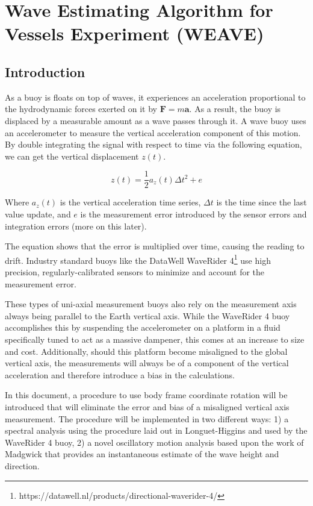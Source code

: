 \chapter{Wave Estimating Algorithm for Vessels Experiment (WEAVE)} 

\section{Introduction} 

As a buoy is floats on top of waves, it experiences an acceleration proportional to the hydrodynamic forces exerted on it by $\pmb{F} = m\pmb{a}$. 
As a result, the buoy is displaced by a measurable amount as a wave passes through it. 
A wave buoy uses an accelerometer to measure the vertical acceleration component of this motion. 
By double integrating the signal with respect to time via the following equation, we can get the vertical displacement $z(t)$.

\begin{equation}
    z(t) = \frac{1}{2} a_z(t) \Delta t^2 + e
\end{equation}

Where $a_z(t)$ is the vertical acceleration time series, $\Delta t$ is the time since the last value update, and $e$ is the measurement error introduced by the sensor errors and integration errors (more on this later).

The equation shows that the error is multiplied over time, causing the reading to drift. 
Industry standard buoys like the DataWell WaveRider 4\footnote{https://datawell.nl/products/directional-waverider-4/} use high precision, regularly-calibrated sensors to minimize and account for the measurement error.

These types of uni-axial measurement buoys also rely on the measurement axis always being parallel to the Earth vertical axis. 
While the WaveRider 4 buoy accomplishes this by suspending the accelerometer on a platform in a fluid specifically tuned to act as a massive dampener, this comes at an increase to size and cost. 
Additionally, should this platform become misaligned to the global vertical axis, the measurements will always be of a component of the vertical acceleration and therefore introduce a bias in the calculations.

In this document, a procedure to use body frame coordinate rotation will be introduced that will eliminate the error and bias of a misaligned vertical axis measurement. 
The procedure will be implemented in two different ways: 1) a spectral analysis using the procedure laid out in Longuet-Higgins \cite{Longuet-Higgins:1963} and used by the WaveRider 4 buoy, 2) a novel oscillatory motion analysis based upon the work of Madgwick \cite{Gait-Tracking} that provides an instantaneous estimate of the wave height and direction.

